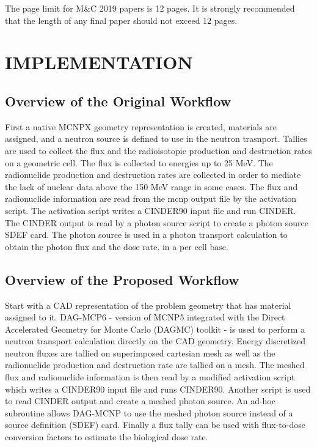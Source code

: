 \documentclass[letterpaper]{mandc2019}
\begin{document}
The page limit for M\&C 2019 papers is 12 pages. It is strongly recommended that 
the length of any final paper should not exceed 12 pages.

\section{IMPLEMENTATION} 
\label{sec:first}

\subsection{Overview of the Original Workflow}

First a native MCNPX geometry representation is created, materials are assigned, 
and a neutron source is defined to use in the neutron trasnport. Tallies are used 
to collect the flux and the radioisotopic production and destruction rates on a 
geometric cell. The flux is collected to energies up to 25 MeV. The 
radionuclide production and destruction rates are collected in order to mediate 
the lack of nuclear data above the 150 MeV range in some cases. 
The flux and radionuclide information are read from the mcnp output file by 
the activation script. The activation script writes a CINDER90 input file 
and run CINDER. The CINDER output is read by a photon source script to create 
a photon source SDEF card. The photon source is used in a photon transport 
calculation to obtain the photon flux and the dose  rate. in a per cell base. 

\subsection{Overview of the Proposed Workflow}

Start with a CAD representation of the problem geometry that has material 
assigned to it. DAG-MCP6 - version of MCNP5 integrated with the Direct Accelerated 
Geometry for Monte Carlo (DAGMC) toolkit - is used to perform a 
neutron transport calculation directly on the CAD geometry. 
Energy discretized neutron fluxes are tallied on superimposed cartesian mesh 
as well as the radionuclide production and destruction rate are tallied 
on a mesh. 
The meshed flux and radionuclide information is then read by a modified 
activation script which writes a CINDER90 input file and runs CINDER90. 
Another script is used to read CINDER output and create a meshed photon source. 
An ad-hoc subroutine allows DAG-MCNP to use the meshed photon source instead 
of a source definition (SDEF) card. Finally a flux tally can be used 
with flux-to-dose conversion factors to estimate the biological dose rate. 
\end{document}
